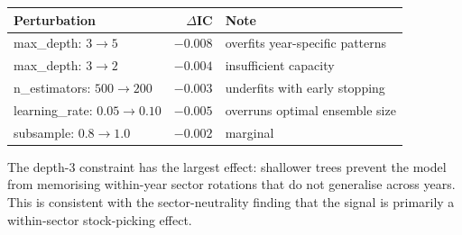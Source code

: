 \documentclass[12pt,a4paper]{article}
\begin{document}
\begin{center}
\begin{tabular}{lrl}
\toprule
Perturbation & $\Delta$IC & Note \\
\midrule
max\_depth: $3 \to 5$ & $-0.008$ & overfits year-specific patterns \\
max\_depth: $3 \to 2$ & $-0.004$ & insufficient capacity \\
n\_estimators: $500 \to 200$ & $-0.003$ & underfits with early stopping \\
learning\_rate: $0.05 \to 0.10$ & $-0.005$ & overruns optimal ensemble size \\
subsample: $0.8 \to 1.0$ & $-0.002$ & marginal \\
\bottomrule
\end{tabular}
\end{center}

The depth-3 constraint has the largest effect: shallower trees prevent the model
from memorising within-year sector rotations that do not generalise across years.
This is consistent with the sector-neutrality finding that the signal is primarily
a within-sector stock-picking effect.
\end{document}
